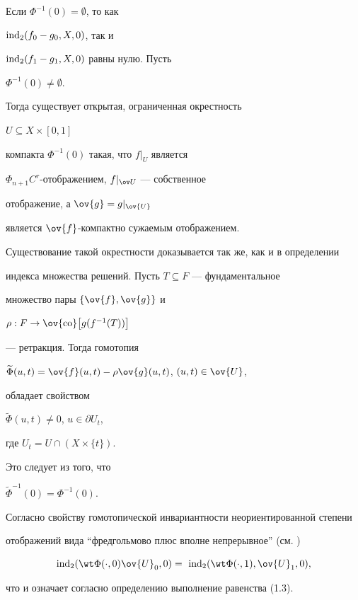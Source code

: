 \begin{pf}


Если $\Phi^{-1}(0) = \emptyset$, то как 


$\operatorname{ind}_2 (f_0 - g_0, X, 0)$, так и 


$\operatorname{ind}_2 (f_1 - g_1, X, 0)$ равны нулю. Пусть 


$\Phi^{-1}(0) \ne\emptyset$.


Тогда существует открытая, ограниченная окрестность


$U \subseteq X\times [0,1]$


компакта $\Phi^{-1}(0)$ такая, что $f|_{U}$ является 


$\Phi_{n+1} C^r$-отображением, $f|_{\ov U}$ --- собственное


отображение, а $\ov {g} = g|_{\ov {U}}$


является $\ov {f}$-компактно сужаемым отображением.


Существование такой окрестности доказывается так же, как и в определении


индекса множества решений. Пусть $T \subseteq F$ --- фундаментальное 


множество пары $\{\ov{f}, \ov{g}\} $ и


$\rho : F \to \ov {\co} \bigl[g (f^{-1}(T)) \bigr]$


--- ретракция. Тогда гомотопия


$\widetilde\Phi (u,t) = \ov {f}(u,t) - 


\rho \ov {g}(u,t)$, $(u,t) \in \ov {U}$,


обладает свойством 


$\widetilde\Phi (u,t) \ne 0$, $u\in \partial U_t$,


где $U_t = U \cap (X\times \{t \})$.


Это следует из того, что


$\widetilde\Phi^{-1}(0) = \Phi^{-1}(0)$.





Согласно свойству гомотопической инвариантности неориентированной степени


отображений вида ``фредгольмово плюс вполне непрерывное'' (см. \cite{4})


$$


\Ind_2 (\wt\Phi (\cdot,0) \ov {U}_0, 0) = \


\Ind_2 (\wt\Phi (\cdot,1),


\ov {U}_1, 0),


$$


что и означает согласно определению выполнение равенства (1.3).


\end{pf}





